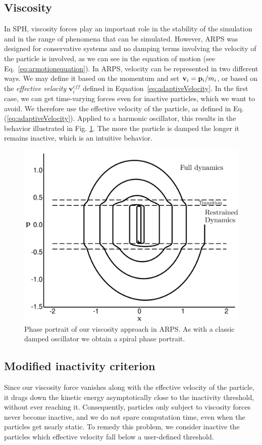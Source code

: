 \subsection{Viscosity}
In SPH, viscosity forces play an important role in the stability of the simulation and in the range of phenomena that can be simulated. 
However, ARPS was designed for conservative systems and no damping terms involving the velocity of the particle is involved, as we can see in the equation of motion (see Eq.~\ref{eq:armotionequation}).
In ARPS, velocity can be represented in two different ways.
We may define it based on the momentum and set $\mathbf{v}_{i} = \mathbf{p}_{i} / m_{i} $, or based on the \emph{effective velocity} $\mathbf{v}_{i}^{eff}$ defined in Equation~\ref{eq:adaptiveVelocity}.
In the first case, we can get time-varying forces even for inactive particles, which we want to avoid.
We therefore use the effective velocity of the particle, as defined in Eq.(\ref{eq:adaptiveVelocity}).
Applied to a harmonic oscillator, this results in the behavior illustrated in Fig. \ref{fig:HODampedPP}.
The more the particle is damped the longer it remains inactive, which is an intuitive behavior.
\begin{figure}[H]
  \centering
  \includegraphics[width=0.8\linewidth]{images/arps-vriphys2013/harmonicOscillatorDampedPhasePortraitraw_hacked.png}
  \caption[ARPS: Phase portrait of a damped ARPS harmonic oscillator]
  {\label{fig:HODampedPP} Phase portrait of our viscosity approach in ARPS.
  As with a classic damped oscillator we obtain a spiral phase portrait.}
\end{figure}
\subsection{Modified inactivity criterion}
Since our viscosity force vanishes along with the effective velocity of the particle, it drags down the kinetic energy asymptotically close to the inactivity threshold, without ever reaching it.
Consequently, particles only subject to viscosity forces never become inactive, and we do not spare computation time, even when the particles get nearly static.
To remedy this problem, we consider inactive the particles which effective velocity fall below a user-defined threshold.

